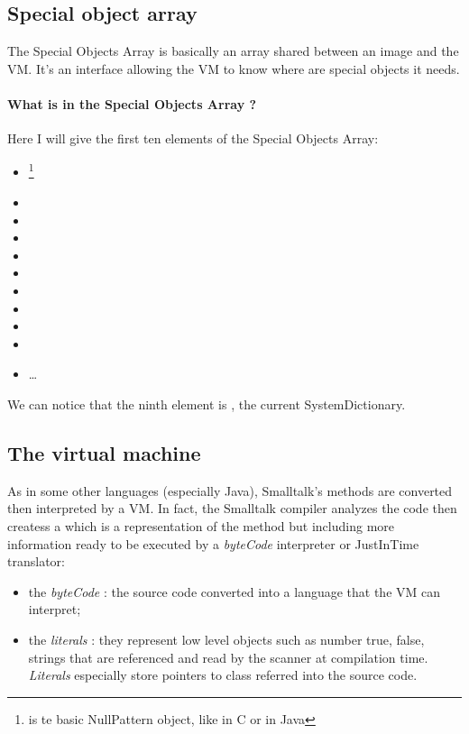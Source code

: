 \subsection{Special object array}

The \gls{Special Objects Array} is basically an array shared between an image and the \gls{VM}. It's an interface allowing the \gls{VM} to know where are special objects it needs.

\paragraph{What is in the Special Objects Array ?}
Here I will give the first ten elements of the \gls{Special Objects Array}:
\begin{itemize}
	\item {}\footnote{ is te basic NullPattern object, like  in C or  in Java} 
	\item {}
	\item {}
	\item {}
	\item {}
	\item {}
	\item {}
	\item {}
	\item {}
	\item {}
	\item \dots
\end{itemize}

We can notice that the ninth element is , the current SystemDictionary.

\subsection{The virtual machine}

As in some other languages (especially Java), Smalltalk's methods are converted then interpreted by a \gls{VM}. In fact, the Smalltalk compiler analyzes the code then createss a  which is a representation of the method but including more information ready to be executed by a \emph{byteCode} interpreter or JustInTime translator:
\begin{itemize}\label{literal}
	\item the \emph{byteCode} : the source code converted into a language that the \gls{VM} can interpret;
	\item the \emph{literals} : they represent low level objects such as number true, false, strings that are referenced and read by the scanner at compilation time. \emph{Literals} especially store pointers to class referred into the source code.
\end{itemize}

